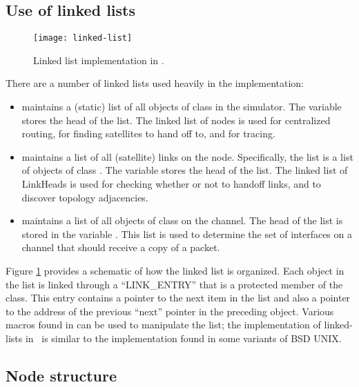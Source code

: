\subsection{Use of linked lists}
\label{sec:satellite/implementation/list}

\begin{figure}
    \centerline{\texttt{[image: linked-list]}}
    \caption{Linked list implementation in \ns.}
    \label{fig:linked-list}
\end{figure}

There are a number of linked lists used heavily in the implementation:
\begin{itemize}

\item {} maintains a (static) list of all objects of class
 in the simulator.  The variable  stores
the head of the list.  The linked list of nodes is used for centralized
routing, for finding satellites to hand off to, and for tracing.

\item {} maintains a list of all (satellite) links on the
node.  Specifically, the list is a list of objects of class . 
The variable  stores the head of the list.  The
linked list of LinkHeads is used for checking whether or not to handoff
links, and to discover topology adjacencies.

\item {} maintains a list of all objects of class
 on the channel.  The head of the list is stored in the variable
.  This list is used to determine the set of interfaces on a
channel that should receive a copy of a packet.
\end{itemize}

Figure \ref{fig:linked-list} provides a schematic of how the linked list
is organized.  Each object in the list is linked through a ``LINK\_ENTRY''
that is a protected member of the class.  This entry contains a pointer
to the next item in the list and also a pointer to the address of the
previous ``next'' pointer in the preceding object.   Various macros
found in  can be used to manipulate the list; the 
implementation of linked-lists in \ns~is similar to the  
implementation found in some variants of BSD UNIX.

\subsection{Node structure}

